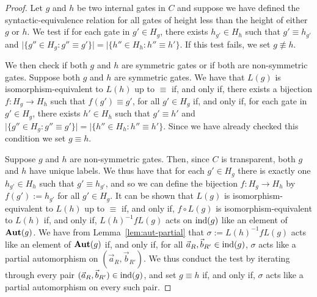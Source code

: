 \documentclass[../paper.tex]{subfiles}
\begin{document}
\begin{proof}
  Let $g$ and $h$ be two internal gates in $C$ and suppose we have defined the
  syntactic-equivalence relation for all gates of height less than the height of
  either $g$ or $h$. We test if for each gate in $g' \in H_g$, there exists
  $h_{g'} \in H_h$ such that $g' \equiv h_{g'}$ and $\vert \{g'' \in H_g : g''
  \equiv g'\} \vert = \vert \{h'' \in H_h : h'' \equiv h'\}$. If this test
  fails, we set $g \not\equiv h$.

  We then check if both $g$ and $h$ are symmetric gates or if both are
  non-symmetric gates. Suppose both $g$ and $h$ are symmetric gates. We have
  that $L(g)$ is isomorphism-equivalent to $L(h)$ up to $\equiv$ if, and only
  if, there exists a bijection $f : H_g \rightarrow H_h$ such that $f(g') \equiv
  g'$, for all $g' \in H_g$ if, and only if, for each gate in $g' \in H_g$,
  there exists $h' \in H_h$ such that $g' \equiv h'$ and $\vert \{g'' \in H_g :
  g'' \equiv g'\} \vert = \vert \{h'' \in H_h : h'' \equiv h'\}$. Since we have
  already checked this condition we set $g \equiv h$.

  Suppose $g$ and $h$ are non-symmetric gates. Then, since $C$ is transparent,
  both $g$ and $h$ have unique labels. We thus have that for each $g' \in H_g$
  there is exactly one $h_{g'} \in H_h$ such that $g' \equiv h_{g'}$, and so we
  can define the bijection $f : H_g \rightarrow H_h$ by $f(g') := h_{g'}$ for
  all $g' \in H_g$. It can be shown that $L(g)$ is isomorphism-equivalent to
  $L(h)$ up to $\equiv$ if, and only if, $f \circ L(g)$ is
  isomorphism-equivalent to $L(h)$ if, and only if, $L(h)^{-1} f L(g)$ acts on
  $\text{\upshape ind} (g)$ like an element of $\text{\textbf{Aut}}(g)$. We have from
  Lemma~\ref{lem:aut-partial} that $\sigma := L(h)^{-1} f L(g)$ acts like an
  element of $\text{\textbf{Aut}}(g)$ if, and only if, for all $\vec{a}_R, \vec{b}_{R'} \in \text{\upshape ind}(g)$,
  $\sigma$ acts like a partial automorphism on $(\vec{a}_R, \vec{b}_{R'})$. We
  thus conduct the test by iterating through every pair $(\vec{a}_R,
  \vec{b}_{R'}) \in \text{\upshape ind}(g)$, and set $g \equiv h$ if, and only if, $\sigma$
  acts like a partial automorphism on every such pair.




\end{proof}
\end{document}
